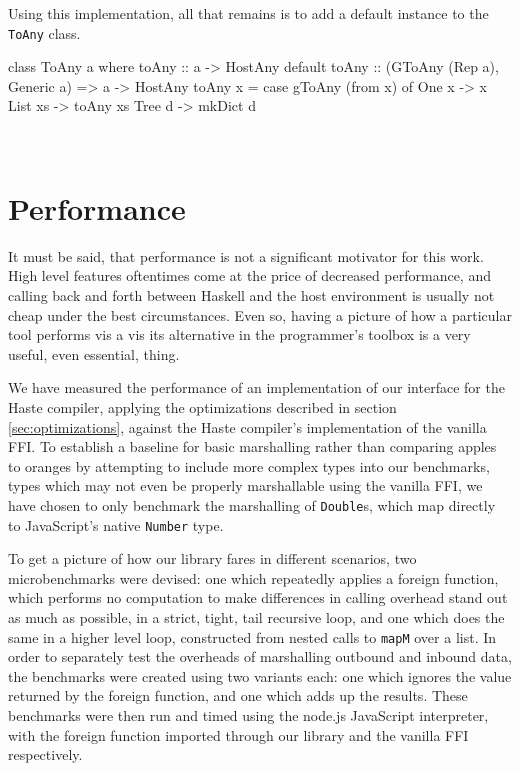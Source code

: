 \documentclass[preprint]{sigplanconf}
\begin{document}
Using this implementation, all that remains is to add a default instance to
the \lstinline!ToAny! class.\\
\begin{code}
  class ToAny a where
    toAny :: a -> HostAny
    default toAny :: (GToAny (Rep a), Generic a)
                  => a -> HostAny
    toAny x =
      case gToAny (from x) of
        One x   -> x
        List xs -> toAny xs
        Tree d  -> mkDict d
\end{code}\\
\section{Performance}
\label{sec:performance}
It must be said, that performance is not a significant motivator for this work.
High level features oftentimes come at the price of decreased performance,
and calling back and forth between Haskell and the host environment is usually
not cheap under the best circumstances.
Even so, having a picture of how a particular tool performs vis a vis its
alternative in the programmer's toolbox is a very useful, even essential,
thing.

We have measured the performance of an implementation of our interface for the
Haste compiler, applying the optimizations described in section
\ref{sec:optimizations}, against the Haste compiler's implementation of the
vanilla FFI. To establish a baseline for basic marshalling rather than
comparing apples to oranges by attempting to include more complex types
into our benchmarks, types which may not even be properly marshallable using
the vanilla FFI, we have chosen to only benchmark the marshalling of
\lstinline!Double!s, which map directly to JavaScript's native
\lstinline!Number! type.

To get a picture of how our library fares in different scenarios,
two microbenchmarks were devised: one which repeatedly applies a foreign
function, which performs no computation to make differences in
calling overhead stand out as much as possible, in a strict, tight, tail
recursive loop, and one which does the same in a higher level loop,
constructed from nested calls to \lstinline!mapM! over a list.
In order to separately
test the overheads of marshalling outbound and inbound data, the benchmarks
were created using two variants each: one which ignores the value returned
by the foreign function, and one which adds up the results.
These benchmarks were then run and timed
using the node.js JavaScript interpreter, with the foreign function imported
through our library and the vanilla FFI respectively.
\end{document}
